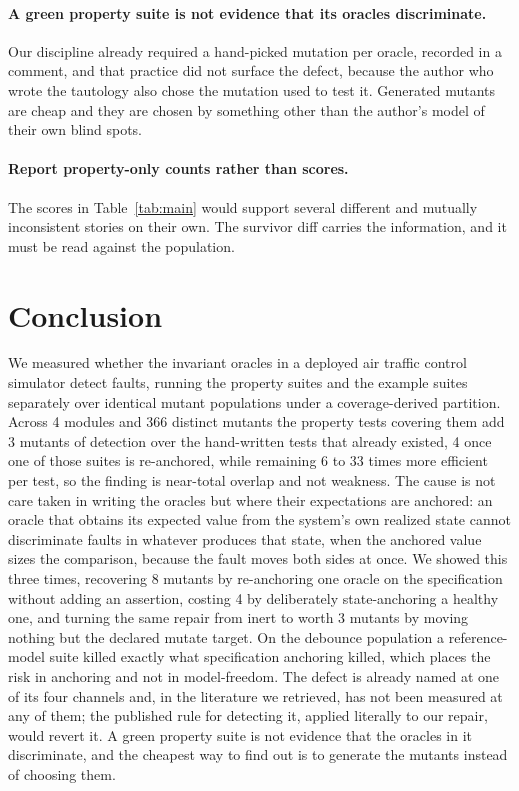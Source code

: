 \documentclass[12pt]{article}
\begin{document}
\paragraph{A green property suite is not evidence that its oracles discriminate.}
Our discipline already required a hand-picked mutation per oracle, recorded in a
comment, and that practice did not surface the defect, because the author who wrote
the tautology also chose the mutation used to test it. Generated mutants are cheap
and they are chosen by something other than the author's model of their own blind
spots.

\paragraph{Report property-only counts rather than scores.} The scores in
Table~\ref{tab:main} would support several different and mutually inconsistent
stories on their own. The survivor diff carries the information, and it must be read
against the population.

\section{Conclusion}

We measured whether the invariant oracles in a deployed air traffic control
simulator detect faults, running the property suites and the example suites
separately over identical mutant populations under a coverage-derived partition.
Across 4 modules and 366 distinct mutants the property tests covering them add
3 mutants of detection over the hand-written tests that already existed, 4
once one of those suites is re-anchored, while remaining 6 to 33 times more
efficient per test, so the finding is near-total overlap and not weakness. The
cause is not care taken in writing the oracles but where their expectations are
anchored: an oracle that obtains its expected value from the system's own realized
state cannot discriminate faults in whatever produces that state, when the anchored
value sizes the comparison, because the fault moves both sides at once. We showed
this three times, recovering 8
mutants by re-anchoring one oracle on the specification without adding an
assertion, costing 4 by deliberately state-anchoring a healthy one, and turning
the same repair from inert to worth 3 mutants by moving nothing but the
declared mutate target. On the debounce population a reference-model suite killed
exactly what specification anchoring killed, which places the risk in anchoring and not in model-freedom. The defect is already named at one of its four
channels and, in the literature we retrieved, has not been measured at any of
them; the published rule for
detecting it, applied literally to our repair, would revert it. A green property
suite is not evidence that the oracles in it discriminate, and the cheapest way to find out is to generate the mutants instead of choosing them.
\end{document}
